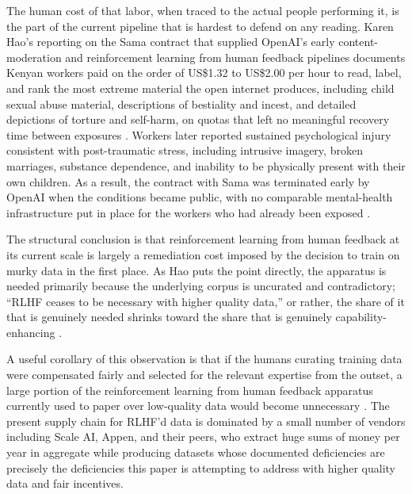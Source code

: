 \documentclass[10pt,a4paper,twocolumn]{article}
\begin{document}
The human cost of that labor, when traced to the actual people performing it, is the part of the current pipeline that is hardest to defend on any reading. Karen Hao's reporting on the Sama contract that supplied OpenAI's early content-moderation and reinforcement learning from human feedback pipelines documents Kenyan workers paid on the order of US\$1.32 to US\$2.00 per hour to read, label, and rank the most extreme material the open internet produces, including child sexual abuse material, descriptions of bestiality and incest, and detailed depictions of torture and self-harm, on quotas that left no meaningful recovery time between exposures \citep[ch.~9]{hao2025empire}. Workers later reported sustained psychological injury consistent with post-traumatic stress, including intrusive imagery, broken marriages, substance dependence, and inability to be physically present with their own children. As a result, the contract with Sama was terminated early by OpenAI when the conditions became public, with no comparable mental-health infrastructure put in place for the workers who had already been exposed \citep[ch.~9]{hao2025empire}.

The structural conclusion is that reinforcement learning from human feedback at its current scale is largely a remediation cost imposed by the decision to train on murky data in the first place. As Hao puts the point directly, the apparatus is needed primarily because the underlying corpus is uncurated and contradictory; ``RLHF ceases to be necessary with higher quality data,'' or rather, the share of it that is genuinely needed shrinks toward the share that is genuinely capability-enhancing \citep[p.~245]{hao2025empire}.

A useful corollary of this observation is that if the humans curating training data were compensated fairly and selected for the relevant expertise from the outset, a large portion of the reinforcement learning from human feedback apparatus currently used to paper over low-quality data would become unnecessary \citep[p.~245]{hao2025empire}. The present supply chain for RLHF'd data is dominated by a small number of vendors including Scale AI, Appen, and their peers, who extract huge sums of money per year in aggregate while producing datasets whose documented deficiencies are precisely the deficiencies this paper is attempting to address with higher quality data and fair incentives.
\end{document}
